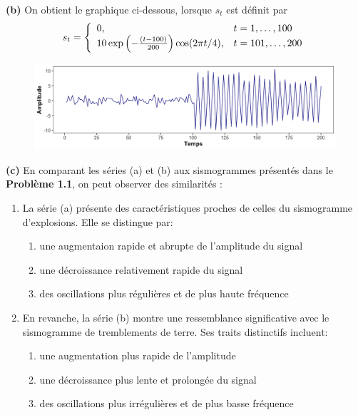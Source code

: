 \documentclass{homework}
\begin{document}
    \newpage
    
\textbf{(b)} On obtient le graphique ci-dessous, lorsque $s_t$ est définit par
    $$s_t = \left\{
    \begin{array}{l l} 
        0, & t = 1, \dots, 100 \\ 
        10\exp\left(-\frac{(t - 100)}{200}\right)\cos(2\pi t / 4), & t = 101, \dots, 200
    \end{array}
  \right.$$
\begin{figure}[h]
    \centering
    \includegraphics[width=1\linewidth]{figure1.2b.png}
\end{figure}
    
\textbf{(c)} En comparant les séries (a) et (b) aux sismogrammes présentés dans le \textbf{Problème 1.1}, on peut observer des similarités :

\begin{enumerate}
    \item La série (a) présente des caractéristiques proches de celles du sismogramme d'explosions. Elle se distingue par:
    \begin{enumerate}
        \item[\textbullet] une augmentaion rapide et abrupte de l'amplitude du signal
        \item[\textbullet] une décroissance relativement rapide du signal
        \item[\textbullet] des oscillations plus régulières et de plus haute fréquence
    \end{enumerate} 
     
    \item En revanche, la série (b) montre une ressemblance significative avec le sismogramme de tremblements de terre. Ses traits distinctifs incluent:
    \begin{enumerate}
        \item[\textbullet] une augmentation plus rapide de l'amplitude
        \item[\textbullet] une décroissance plus lente et prolongée du signal
        \item[\textbullet] des oscillations plus irrégulières et de plus basse fréquence
    \end{enumerate} 
\end{enumerate}
\end{document}
